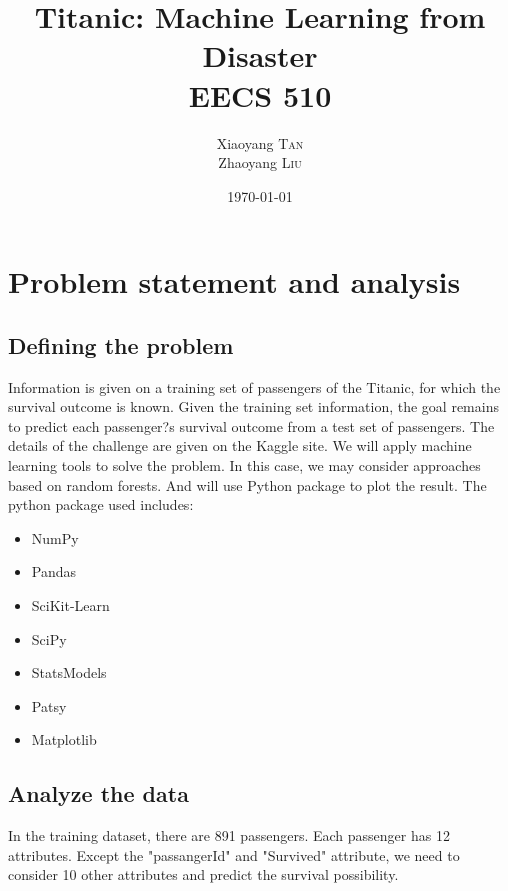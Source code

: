 \documentclass{article}
\title{Titanic: Machine Learning from Disaster \\ EECS 510} %
\author{Xiaoyang \textsc{Tan} \\ Zhaoyang \textsc{Liu} } %
\date{\today} %
\begin{document}
\maketitle


\section{Problem statement and analysis}

\subsection{Defining the problem}

\label{definitions}
	Information is given on a training set of passengers of the Titanic, for which the survival outcome is known. Given the training set information, the goal remains to predict each passenger?s survival outcome from a test set of passengers. The details of the challenge are given on the Kaggle site.
\newline
\newline
We will apply machine learning tools to solve the problem. In this case, we may consider approaches based on random forests. And will use Python package to plot the result. The python package used includes:

\begin{itemize}
	\item NumPy
	\item Pandas
	\item SciKit-Learn
	\item SciPy
	\item StatsModels
	\item Patsy
	\item Matplotlib
\end{itemize}
 


\subsection{Analyze the data}
In the training dataset, there are 891 passengers. Each passenger has 12 attributes. Except the "passangerId" and "Survived" attribute, we need to consider 10 other attributes 
and predict the survival possibility.
\end{document}
